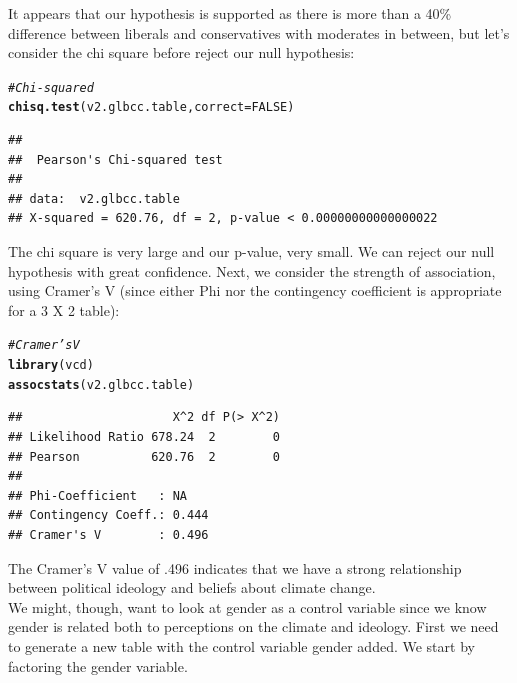 \documentclass[11pt,openany]{book}\usepackage[]{graphicx}\usepackage[]{color}
\makeatletter
\newcommand{\hlnum}[1]{\textcolor[rgb]{0.686,0.059,0.569}{#1}}%
\newcommand{\hlcom}[1]{\textcolor[rgb]{0.678,0.584,0.686}{\textit{#1}}}%
\newcommand{\hlstd}[1]{\textcolor[rgb]{0.345,0.345,0.345}{#1}}%
\newcommand{\hlkwc}[1]{\textcolor[rgb]{0.333,0.667,0.333}{#1}}%
\newcommand{\hlkwd}[1]{\textcolor[rgb]{0.737,0.353,0.396}{\textbf{#1}}}%
\newenvironment{kframe}{%
 \def\at@end@of@kframe{}%
 \ifinner\ifhmode%
  \def\at@end@of@kframe{\end{minipage}}%
  \begin{minipage}{\columnwidth}%
 \fi\fi%
 \def\FrameCommand##1{\hskip\@totalleftmargin \hskip-\fboxsep
 \colorbox{shadecolor}{##1}\hskip-\fboxsep
     \hskip-\linewidth \hskip-\@totalleftmargin \hskip\columnwidth}%
 \MakeFramed {\advance\hsize-\width
   \@totalleftmargin\z@ \linewidth\hsize
   \@setminipage}}%
 {\par\unskip\endMakeFramed%
 \at@end@of@kframe}
\newenvironment{knitrout}{}{} %
\renewenvironment{knitrout}{\begin{singlespace}}{\end{singlespace}}
\makeatother
\begin{document}
\noindent It appears that our hypothesis is supported as there is more than a 40\% difference between liberals and conservatives with moderates in between, but let's consider the chi square before reject our null hypothesis:
\begin{knitrout}
\color{fgcolor}\begin{kframe}
\begin{alltt}
\hlcom{# Chi-squared}
\hlkwd{chisq.test}\hlstd{(v2.glbcc.table,} \hlkwc{correct} \hlstd{=} \hlnum{FALSE}\hlstd{)}
\end{alltt}
\begin{verbatim}
## 
## 	Pearson's Chi-squared test
## 
## data:  v2.glbcc.table
## X-squared = 620.76, df = 2, p-value < 0.00000000000000022
\end{verbatim}
\end{kframe}
\end{knitrout}

\noindent The chi square is very large and our p-value, very small. We can reject our null hypothesis with great confidence.  Next, we consider the strength of association, using Cramer's V (since either Phi nor the contingency coefficient is appropriate for a 3 X 2 table):

\begin{knitrout}
\color{fgcolor}\begin{kframe}
\begin{alltt}
\hlcom{# Cramer's V}
\hlkwd{library}\hlstd{(vcd)}
\hlkwd{assocstats}\hlstd{(v2.glbcc.table)}
\end{alltt}
\begin{verbatim}
##                     X^2 df P(> X^2)
## Likelihood Ratio 678.24  2        0
## Pearson          620.76  2        0
## 
## Phi-Coefficient   : NA 
## Contingency Coeff.: 0.444 
## Cramer's V        : 0.496
\end{verbatim}
\end{kframe}
\end{knitrout}

\noindent The Cramer's V value of .496 indicates that we have a strong relationship between political ideology and beliefs about climate change.\\

We might, though, want to look at gender as a control variable since we know gender is related both to perceptions on the climate and ideology.  First we need to generate a new table with the control variable gender added.  We start by factoring the gender variable.
\end{document}
